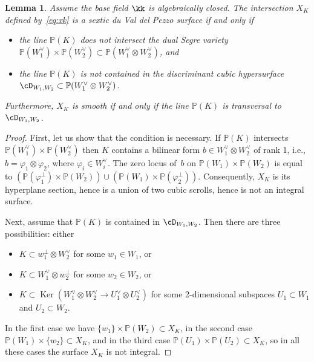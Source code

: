 \documentclass[11pt]{amsart}
\renewcommand{\P}{{\mathbb{P}}}
\DeclareMathOperator{\Ker}{\mathrm{Ker}}
\theoremstyle{plain}
\newtheorem{lemma}[theorem]{Lemma}
\theoremstyle{definition}
\theoremstyle{remark}
\begin{document}
\begin{lemma}\label{lemma:xk-duval}
Assume the base field $\kk$ is algebraically closed.
The intersection $X_K$ defined by~\textup{\eqref{eq:xk}} is a sextic du Val del Pezzo surface if and only if 
\begin{itemize}
\item the line $\P(K)$ does not intersect the dual Segre variety $\P(W_1^\vee) \times \P(W_2^\vee) \subset \P(W_1^\vee \otimes W_2^\vee)$, and
\item the line $\P(K)$ is not contained in the discriminant cubic hypersurface $\cD_{W_1,W_2} \subset \P(W_1^\vee \otimes W_2^\vee)$.
\end{itemize}
Furthermore, $X_K$ is smooth if and only if the line $\P(K)$ is transversal to $\cD_{W_1,W_2}$.
\end{lemma}
\begin{proof}
First, let us show that the condition is necessary.
If $\P(K)$ intersects $\P(W_1^\vee) \times \P(W_2^\vee)$ then $K$ contains a bilinear form $b \in W_1^\vee \otimes W_2^\vee$ of rank 1, i.e., $b = \varphi_1 \otimes \varphi_2$, where $\varphi_i \in W_i^\vee$.
The zero locus of~$b$ on $\P(W_1) \times \P(W_2)$ is equal to $(\P(\varphi_1^\perp) \times \P(W_2)) \cup (\P(W_1) \times \P(\varphi_2^\perp))$. 
Consequently, $X_K$ is its hyperplane section, hence is a union of two cubic scrolls, hence is not an integral surface.

Next, assume that $\P(K)$ is contained in $\cD_{W_1,W_2}$. 
Then there are three possibilities: either
\begin{itemize}
\item 
$K \subset w_1^\perp \otimes W_2^\vee$ for some $w_1 \in W_1$, or
\item 
$K \subset W_1^\vee \otimes w_2^\perp$ for some $w_2 \in W_2$, or
\item 
$K \subset \Ker(W_1^\vee \otimes W_2^\vee \to U_1^\vee \otimes U_2^\vee)$ for some 2-dimensional subspaces $U_1 \subset W_1$ and $U_2  \subset W_2$.
\end{itemize}
In the first case we have $\{w_1\} \times \P(W_2) \subset X_K$, in the second case $\P(W_1) \times \{w_2\} \subset X_K$, and in the third case $\P(U_1) \times \P(U_2) \subset X_K$,
so in all these cases the surface $X_K$ is not integral.


\end{proof}
\end{document}
